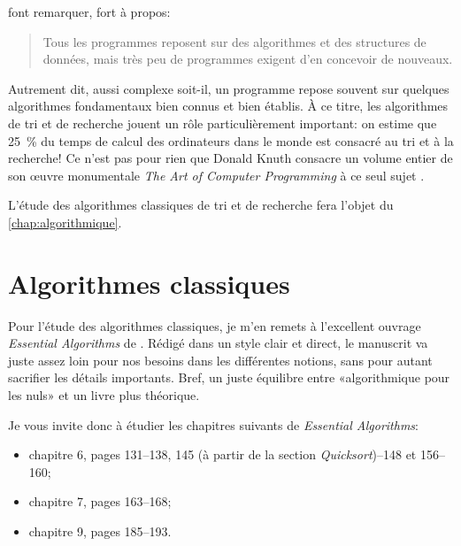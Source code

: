 \citet{Kernighan:practice:1999} font remarquer, fort à propos:
\begin{quote}
  Tous les programmes reposent sur des algorithmes et des structures
  de données, mais très peu de programmes exigent d'en concevoir de
  nouveaux.
\end{quote}
Autrement dit, aussi complexe soit-il, un programme repose souvent sur
quelques algorithmes fondamentaux bien connus et bien établis. À ce
titre, les algorithmes de tri et de recherche jouent un rôle
particulièrement important: on estime que 25~\% du temps de calcul des
ordinateurs dans le monde est consacré au tri et à la recherche! Ce
n'est pas pour rien que Donald Knuth consacre un volume entier de son
œuvre monumentale \emph{The Art of Computer Programming} à ce seul
sujet \citep{Knuth:ACP:vol1:1997}.

L'étude des algorithmes classiques de tri et de recherche fera l'objet
du \autoref{chap:algorithmique}.



\section{Algorithmes classiques}
\label{sec:algorithmique:tri}

Pour l'étude des algorithmes classiques, je m'en remets à l'excellent
ouvrage \emph{Essential Algorithms} de
\citet{Stephens:algorithms:2013}. Rédigé dans un style clair et
direct, le manuscrit va juste assez loin pour nos besoins dans les
différentes notions, sans pour autant sacrifier les détails
importants. Bref, un juste équilibre entre «algorithmique pour les
nuls» et un livre plus théorique.

Je vous invite donc à étudier les chapitres suivants de \emph{Essential
Algorithms}:
\begin{itemize}
\item chapitre 6, pages 131--138, 145 (à partir de la section
  \emph{Quicksort})--148 et 156--160;
\item chapitre 7, pages 163--168;
\item chapitre 9, pages 185--193.
\end{itemize}

